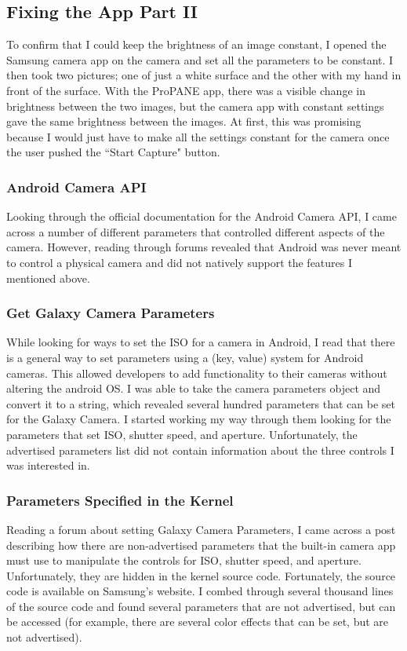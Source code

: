 \documentclass[]{article}
\begin{document}
		\subsection{Fixing the App Part II}
			To confirm that I could keep the brightness of an image constant, I opened the Samsung camera app on the camera and set all the parameters to be constant. I then took two pictures; one of just a white surface and the other with my hand in front of the surface. With the ProPANE app, there was a visible change in brightness between the two images, but the camera app with constant settings gave the same brightness between the images. At first, this was promising because I would just have to make all the settings constant for the camera once the user pushed the ``Start Capture" button. 
			
			\subsubsection{Android Camera API}
				Looking through the official documentation for the Android Camera API, I came across a number of different parameters that controlled different aspects of the camera. However, reading through forums revealed that Android was never meant to control a physical camera and did not natively support the features I mentioned above.
				
			\subsubsection{Get Galaxy Camera Parameters}
				While looking for ways to set the ISO for a camera in Android, I read that there is a general way to set parameters using a (key, value) system for Android cameras. This allowed developers to add functionality to their cameras without altering the android OS. I was able to take the camera parameters object and convert it to a string, which revealed several hundred parameters that can be set for the Galaxy Camera. I started working my way through them looking for the parameters that set ISO, shutter speed, and aperture. Unfortunately, the advertised parameters list did not contain information about the three controls I was interested in.
				
			\subsubsection{Parameters Specified in the Kernel}
				Reading a forum about setting Galaxy Camera Parameters, I came across a post describing how there are non-advertised parameters that the built-in camera app must use to manipulate the controls for ISO, shutter speed, and aperture. Unfortunately, they are hidden in the kernel source code. Fortunately, the source code is available on Samsung's website. I combed through several thousand lines of the source code and found several parameters that are not advertised, but can be accessed (for example, there are several color effects that can be set, but are not advertised). 
				
\end{document}
